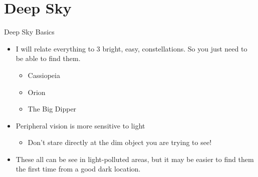 \documentclass[pdf, ]{beamer}
\newcommand{\secimg}{SecMoon.png}
\begin{document}
\renewcommand{\secimg}{SecDeepSky.png}
\section{Deep Sky}

\begin{frame}{Deep Sky Basics}
	\begin{itemize}
		\item I will relate everything to 3 bright, easy, constellations. So you just need to be able to find them.
			\begin{itemize}
				\item Cassiopeia
				\item Orion
				\item The Big Dipper
			\end{itemize}
		\item Peripheral vision is more sensitive to light
			\begin{itemize}
				\item Don't stare directly at the dim object you are trying to see!
			\end{itemize}
		\item These all can be see in light-polluted areas, but it may be easier to find them the first time from a good dark location.
			
			
	\end{itemize}
	
\end{frame}
\end{document}
